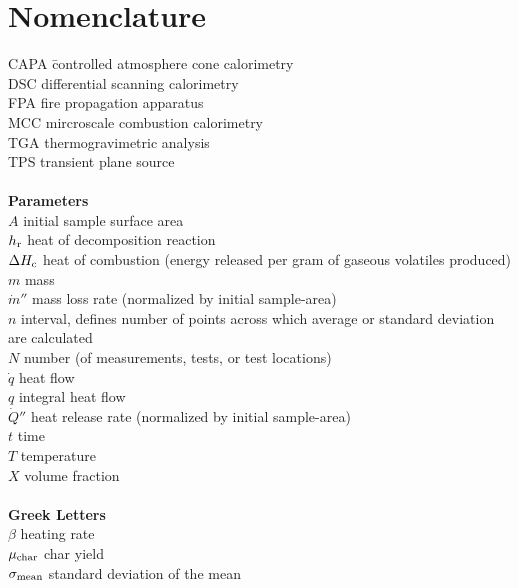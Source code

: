 \chapter{Nomenclature}
\label{nomenclature}

\begin{tabbing}
CAPA		\hspace{1in}\= controlled atmosphere cone calorimetry\\
DSC					\>differential scanning calorimetry\\
FPA		        		\> fire propagation apparatus\\
MCC		        		\> mircroscale combustion calorimetry\\
TGA		        		\> thermogravimetric analysis\\
TPS		        		\> transient plane source\\

\hspace{0.1in}            		\> \\
{\bf  Parameters}       	\> \\
$A$		        			\> initial sample surface area\\
$h_{\rm r}$        	\> heat of decomposition reaction\\
$\Delta H_{\rm c}$		\> heat of combustion (energy released per gram of gaseous volatiles produced)\\
$m$		        			\> mass\\
$\dot{m}''$			\> mass loss rate (normalized by initial sample-area)\\
$n$						\> interval, defines number of points across which  average or standard deviation are calculated\\
$N$		        			\> number (of measurements, tests, or test locations)\\
$\dot{q}$		     		\> heat flow\\
$q$		        			\> integral heat flow\\
$\dot{Q}''$			\> heat release rate (normalized by initial sample-area)\\
$t$						\> time\\
$T$						\> temperature \\
$X$               				\> volume fraction \\

\hspace{0.1in}            		\> \\
{\bf Greek Letters}       	\> \\
$\beta$               \> heating rate\\
$\mu_{\rm char}$		\> char yield\\
$\sigma_{\rm mean}$   	 	\> standard deviation of the mean \\


\end{tabbing}
